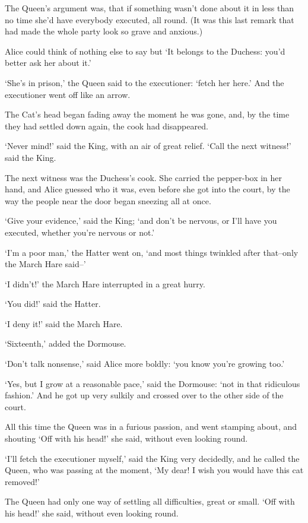 \documentclass[statementpaper,twoside,openany]{memoir}
\begin{document}
The Queen's argument was, that if something wasn't done about it in less than no time she'd have everybody executed, all round. (It was this last remark that had made the whole party look so grave and anxious.)

Alice could think of nothing else to say but `It belongs to the Duchess: you'd better ask her about it.'

`She's in prison,' the Queen said to the executioner: `fetch her here.' And the executioner went off like an arrow.

The Cat's head began fading away the moment he was gone, and, by the time they had settled down again, the cook had disappeared.

`Never mind!' said the King, with an air of great relief. `Call the next witness!' said the King.

The next witness was the Duchess's cook. She carried the pepper-box in her hand, and Alice guessed who it was, even before she got into the court, by the way the people near the door began sneezing all at once.

`Give your evidence,' said the King; `and don't be nervous, or I'll have you executed, whether you're nervous or not.'

`I'm a poor man,' the Hatter went on, `and most things twinkled after that--only the March Hare said--'

`I didn't!' the March Hare interrupted in a great hurry.

`You did!' said the Hatter.

`I deny it!' said the March Hare.

`Sixteenth,' added the Dormouse.

`Don't talk nonsense,' said Alice more boldly: `you know you're growing too.'

`Yes, but I grow at a reasonable pace,' said the Dormouse: `not in that ridiculous fashion.' And he got up very sulkily and crossed over to the other side of the court.

All this time the Queen was in a furious passion, and went stamping about, and shouting `Off with his head!' she said, without even looking round.

`I'll fetch the executioner myself,' said the King very decidedly, and he called the Queen, who was passing at the moment, `My dear! I wish you would have this cat removed!'

The Queen had only one way of settling all difficulties, great or small. `Off with his head!' she said, without even looking round.
\end{document}
